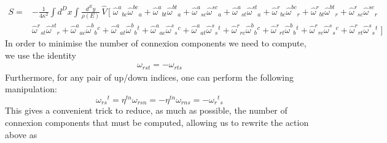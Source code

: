 \documentclass{article}
\begin{document}
\begin{equation}
  \begin{aligned}
S=&-\frac{1}{4\kappa^{2}}\int d^{D}x\int\frac{d^{E}y}{\rho(E)}\,\hat V\,\Big[\;
\hat\omega^a{}_{b  c}\hat \omega^{bc}{}_a
+\hat \omega^a{}_{b  t}\hat \omega^{bt}{}_a
+\hat\omega^a{}_{s  c}\hat\omega^{sc}{}_a
+\hat\omega^a{}_{s  t}\hat\omega^{st}{}_a
+\hat\omega^r{}_{b  c}\hat\omega^{bc}{}_r
+\hat\omega^r{}_{b  t}\hat\omega^{bt}{}_r
+\hat\omega^r{}_{s  c}\hat\omega^{sc}{}_r \\
&\hat\omega^r{}_{s  t}\hat\omega^{st}{}_r
+\hat\omega^a{}_{ac}\hat\omega^b{}_b{}^c
+\hat\omega^a{}_{at}\hat\omega^b{}_b{}^t 
+\hat\omega^a{}_{ac}\hat\omega^s{}_s{}^c 
+\hat\omega^a{}_{at}\hat\omega^s{}_s{}^t
+\hat\omega^r{}_{rc}\hat\omega^b{}_b{}^c
+\hat\omega^r{}_{rt}\hat\omega^b{}_b{}^t
+\hat\omega^r{}_{rc}\hat\omega^s{}_s{}^c
+\hat\omega^r{}_{rt}\hat\omega^s{}_s{}^t
\;\Big]
\end{aligned}
\end{equation}
In order to minimise the number of connexion components we need to compute, we use the identity
\begin{eqnarray}
    \omega_{rst} = -\omega_{rts}
\end{eqnarray}
Furthermore, for any pair of up/down indices, one can perform the following manipulation:
\begin{equation*}
    \omega_{rs}{}^{t} = \eta^{tn}\omega_{rsn} = - \eta^{tn}\omega_{rns} = - \omega_{r}{}^t{}_s
\end{equation*}
This gives a convenient trick to reduce, as much as possible, the number of connexion components that must be computed, allowing us to rewrite the action above as
\end{document}

